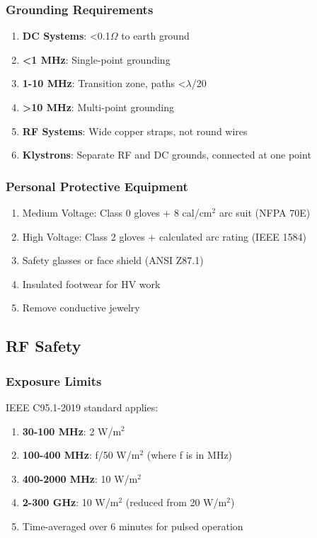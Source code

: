 \subsubsection{Grounding Requirements}
\label{sec:grounding}
\begin{enumerate}[noitemsep]
    \item \textbf{DC Systems}: <0.1$\Omega$ to earth ground
    \item \textbf{<1 MHz}: Single-point grounding
    \item \textbf{1-10 MHz}: Transition zone, paths <$\lambda$/20
    \item \textbf{>10 MHz}: Multi-point grounding
    \item \textbf{RF Systems}: Wide copper straps, not round wires
    \item \textbf{Klystrons}: Separate RF and DC grounds, connected at one point
\end{enumerate}

\subsubsection{Personal Protective Equipment}
\begin{enumerate}[noitemsep]
    \item Medium Voltage: Class 0 gloves + 8 cal/cm$^2$ arc suit (NFPA 70E)
    \item High Voltage: Class 2 gloves + calculated arc rating (IEEE 1584)
    \item Safety glasses or face shield (ANSI Z87.1)
    \item Insulated footwear for HV work
    \item Remove conductive jewelry
\end{enumerate}

\subsection{RF Safety}

\subsubsection{Exposure Limits}
IEEE C95.1-2019 standard applies:
\begin{enumerate}[noitemsep]
    \item \textbf{30-100 MHz}: 2 W/m$^2$
    \item \textbf{100-400 MHz}: f/50 W/m$^2$ (where f is in MHz)
    \item \textbf{400-2000 MHz}: 10 W/m$^2$
    \item \textbf{2-300 GHz}: 10 W/m$^2$ (reduced from 20 W/m$^2$)
    \item Time-averaged over 6 minutes for pulsed operation
\end{enumerate}

